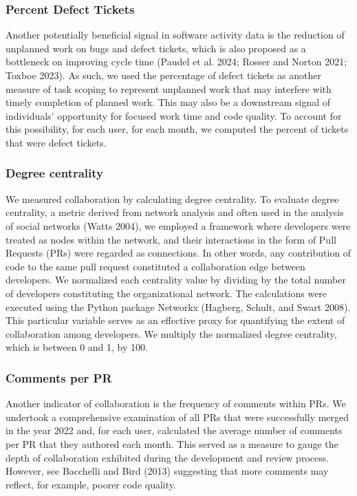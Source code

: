 \documentclass[
]{article}
\begin{document}
\subsubsection{Percent Defect Tickets}\label{percent-defect-tickets}

Another potentially beneficial signal in software activity data is the
reduction of unplanned work on bugs and defect tickets, which is also
proposed as a bottleneck on improving cycle time (Paudel et al. 2024;
Rosser and Norton 2021; Toxboe 2023). As such, we used the percentage of
defect tickets as another measure of task scoping to represent unplanned
work that may interfere with timely completion of planned work. This may
also be a downstream signal of individuals' opportunity for focused work
time and code quality. To account for this possibility, for each user,
for each month, we computed the percent of tickets that were defect
tickets.

\subsubsection{Degree centrality}\label{degree-centrality}

We measured collaboration by calculating degree centrality. To evaluate
degree centrality, a metric derived from network analysis and often used
in the analysis of social networks (Watts 2004), we employed a framework
where developers were treated as nodes within the network, and their
interactions in the form of Pull Requests (PRs) were regarded as
connections. In other words, any contribution of code to the same pull
request constituted a collaboration edge between developers. We
normalized each centrality value by dividing by the total number of
developers constituting the organizational network. The calculations
were executed using the Python package Networkx (Hagberg, Schult, and
Swart 2008). This particular variable serves as an effective proxy for
quantifying the extent of collaboration among developers. We multiply
the normalized degree centrality, which is between 0 and 1, by 100.

\subsubsection{Comments per PR}\label{comments-per-pr}

Another indicator of collaboration is the frequency of comments within
PRs. We undertook a comprehensive examination of all PRs that were
successfully merged in the year 2022 and, for each user, calculated the
average number of comments per PR that they authored each month. This
served as a measure to gauge the depth of collaboration exhibited during
the development and review process. However, see Bacchelli and Bird
(2013) suggesting that more comments may reflect, for example, poorer
code quality.
\end{document}
